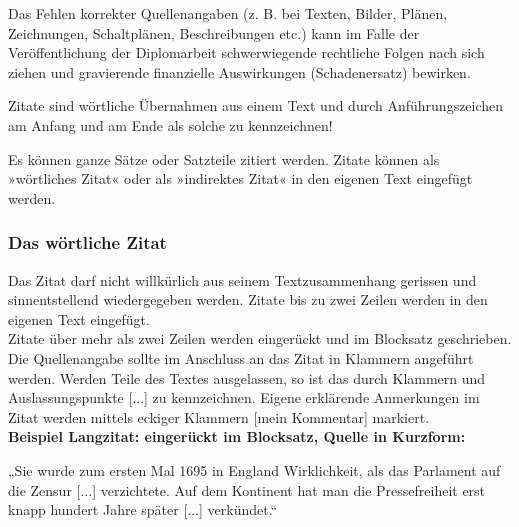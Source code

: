 \documentclass[a4paper, 12pt, xcolor=dvipsnames]{scrartcl}		%
\begin{document}
Das Fehlen korrekter Quellenangaben (z. B. bei Texten, Bilder, Plänen, Zeichnungen, Schaltplänen, Beschreibungen etc.)
kann im Falle der Veröffentlichung der Diplomarbeit schwerwiegende rechtliche Folgen nach sich ziehen und gravierende
finanzielle Auswirkungen (Schadenersatz) bewirken.\\

%
\begin{Merksatz}
Zitate sind wörtliche Übernahmen aus einem Text und durch Anführungszeichen am Anfang und am Ende als solche zu kennzeichnen!
\end{Merksatz}
%
Es können ganze Sätze oder Satzteile zitiert werden. Zitate können als »wörtliches Zitat« oder als »indirektes Zitat« in den eigenen Text eingefügt werden.

\subsubsection{Das wörtliche Zitat}
Das Zitat darf nicht willkürlich aus seinem Textzusammenhang gerissen und sinnentstellend wiedergegeben werden.
Zitate bis zu zwei Zeilen werden in den eigenen Text eingefügt.\\
Zitate über mehr als zwei Zeilen werden eingerückt und im Blocksatz geschrieben. Die Quellenangabe sollte im Anschluss an das Zitat in Klammern angeführt werden. Werden Teile des Textes ausgelassen, so ist das durch Klammern und Auslassungspunkte [...] zu kennzeichnen. Eigene erklärende Anmerkungen im Zitat werden mittels eckiger Klammern [mein Kommentar] markiert. \\

\textbf{Beispiel Langzitat: eingerückt im Blocksatz, Quelle in Kurzform:}\\
\vspace{-0.3cm}

\hspace{1.0cm}
    \begin{minipage}{0.935\textwidth}
	\linespread {1.25}
„Sie wurde zum ersten Mal 1695 in England Wirklichkeit, als das Parlament auf die Zensur [...]
verzichtete. Auf dem Kontinent hat man die Pressefreiheit erst knapp hundert Jahre später
[...] verkündet.“ \cite{Buch:Killinger}
    \end{minipage}
\vspace{0.5cm}
%
\end{document}
